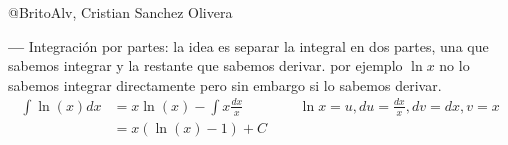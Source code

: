 \documentclass[14pt]{extarticle}
\begin{document}
\begin{center}
      @BritoAlv, Cristian Sanchez Olivera
\end{center}

\textbf{---}   Integración por partes: la idea es separar la integral en dos partes, una que sabemos integrar y la restante que sabemos derivar. por ejemplo $\ln x$ no lo sabemos integrar directamente pero sin embargo si lo sabemos derivar.
\begin{align}
      \int \ln(x)dx
       & = x\ln(x) - \int x \frac{dx}{x} &  & \text{    $\ln x = u, du = \frac{dx}{x}, dv = dx, v = x$} \\
       & = x(\ln(x)-1) + C                                                                              \\
\end{align}
\end{document}
